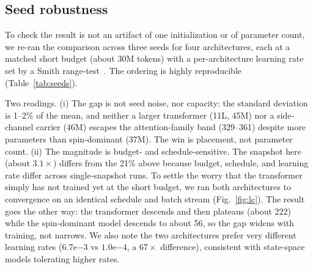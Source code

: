 \documentclass[10pt,twocolumn]{article}
\begin{document}
\subsection{Seed robustness}
To check the result is not an artifact of one initialization or of parameter count, we re-ran the comparison across three seeds for four architectures, each at a matched short budget (about 30M tokens) with a per-architecture learning rate set by a Smith range-test~\cite{smith2017}. The ordering is highly reproducible (Table~\ref{tab:seeds}).

\begin{table}[t]\centering\small
\caption{Multi-seed robustness across the attention family vs spin-as-core (3 seeds each; per-architecture range-test lr; matched 30M-token budget).}
\label{tab:seeds}
\end{table}

Two readings. (i) The gap is not seed noise, nor capacity: the standard deviation is 1--2\% of the mean, and neither a larger transformer (11L, 45M) nor a side-channel carrier (46M) escapes the attention-family band (329--361) despite more parameters than spin-dominant (37M). The win is placement, not parameter count. (ii) The magnitude is budget- and schedule-sensitive. The snapshot here (about $3.1\times$) differs from the 21\% above because budget, schedule, and learning rate differ across single-snapshot runs. To settle the worry that the transformer simply has not trained yet at the short budget, we ran both architectures to convergence on an identical schedule and batch stream (Fig.~\ref{fig:lc}). The result goes the other way: the transformer descends and then plateaus (about 222) while the spin-dominant model descends to about 56, so the gap widens with training, not narrows. We also note the two architectures prefer very different learning rates ($6.7\mathrm{e}{-3}$ vs $1.0\mathrm{e}{-4}$, a $67\times$ difference), consistent with state-space models tolerating higher rates.
\end{document}
